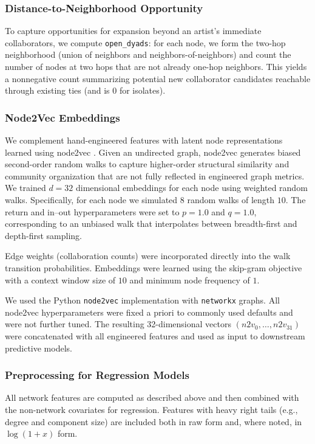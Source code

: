 \documentclass[fleqn,10pt]{wlscirep}
\begin{document}
\subsubsection*{Distance-to-Neighborhood Opportunity}
To capture opportunities for expansion beyond an artist’s immediate collaborators, we compute \texttt{open\_dyads}: for each node, we form the two-hop neighborhood (union of neighbors and neighbors-of-neighbors) and count the number of nodes at two hops that are not already one-hop neighbors. This yields a nonnegative count summarizing potential new collaborator candidates reachable through existing ties (and is 0 for isolates).

\subsubsection*{Node2Vec Embeddings}
We complement hand-engineered features with latent node representations learned using node2vec \cite{Grover2016Node2Vec}. Given an undirected graph, node2vec generates biased second-order random walks to capture higher-order structural similarity and community organization that are not fully reflected in engineered graph metrics. We trained $d=32$ dimensional embeddings for each node using weighted random walks. Specifically, for each node we simulated $8$ random walks of length $10$. The return and in--out hyperparameters were set to $p=1.0$ and $q=1.0$, corresponding to an unbiased walk that interpolates between breadth-first and depth-first sampling.

Edge weights (collaboration counts) were incorporated directly into the walk transition probabilities. Embeddings were learned using the skip-gram objective with a context window size of $10$ and minimum node frequency of $1$.

We used the Python \texttt{node2vec} implementation with \texttt{networkx} graphs. All node2vec hyperparameters were fixed a priori to commonly used defaults and were not further tuned. The resulting 32-dimensional vectors
$(n2v_0, \dots, n2v_{31})$
were concatenated with all engineered features and used as input to downstream predictive models.


\subsubsection*{Preprocessing for Regression Models}
All network features are computed as described above and then combined with the non-network covariates for regression. Features with heavy right tails (e.g., degree and component size) are included both in raw form and, where noted, in $\log(1+x)$ form.
\end{document}
